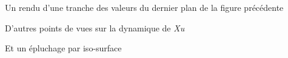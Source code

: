\documentclass[a4paper,dvips]{slides}
\renewcommand{\arule}[1]{\emph{\mbox{#1}}} %
\newenvironment{mynote}{\begin{note}\begin{scriptsize}}{\end{scriptsize}\end{note}}
\begin{document}

\begin{slide}
  {Un rendu d'une tranche des valeurs du dernier
    plan de la figure pr\'ec\'edente}%
\end{slide}

\begin{slide}
  {D'autres points de vues sur la dynamique de \arule{Xu}}%
\end{slide}

\begin{slide}
  {Et un \'epluchage par iso-surface}%
\end{slide}

\end{document}
